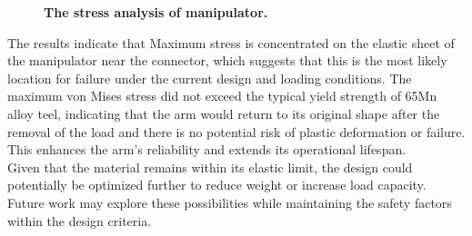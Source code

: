 \begin{itemize}
\begin{figure}[H]
        \caption[The stress analysis of manipulator]
        {\centering \textbf{The stress analysis of manipulator.}}
        \label{fig:stress}
    \end{figure}
\end{itemize}
The results indicate that Maximum stress is concentrated on the elastic sheet of the manipulator near the 
connector, which suggests that this is the most likely location for failure under the current design and 
loading conditions. The maximum von Mises stress did not exceed the typical yield strength of 65Mn alloy 
teel, indicating that the arm would return to its original shape after the removal of the load and there is 
no potential risk of plastic deformation or failure. This enhances the arm's reliability and extends its 
operational lifespan. \\
Given that the material remains within its elastic limit, the design could potentially be optimized further 
to reduce weight or increase load capacity. Future work may explore these possibilities while maintaining 
the safety factors within the design criteria.
